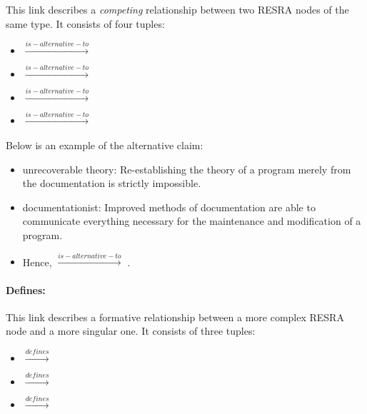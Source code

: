 This link describes a {\it competing\/} relationship between two RESRA
nodes of the same type. It consists of four tuples:

\begin{itemize}
\item {}
\( \stackrel{is-alternative-to}{\longrightarrow}  \)

\item {}
  \( \stackrel{is-alternative-to}{\longrightarrow} \)

\item {}
  \( \stackrel{is-alternative-to}{\longrightarrow} \)

\item {}
  \( \stackrel{is-alternative-to}{\longrightarrow} \)
\end{itemize}

\paragraph{}Below is an example of the alternative claim:

\small
\begin{itemize}
\item {\sf unrecoverable theory}: Re-establishing the theory of a program
  merely from the documentation is strictly impossible.
  
\item {\sf documentationist}: Improved methods of documentation
  are able to communicate everything necessary for the maintenance and
  modification of a program.
  
\item Hence, \hspace{.01in} 
  \( \stackrel{is-alternative-to}{\longrightarrow} \) .
\end{itemize}
\normalsize

\paragraph{Defines:}

This link describes a formative relationship between a more complex RESRA
node and a more singular one. It consists of three tuples:

\begin{itemize}
\item {} \( \stackrel{defines}{\longrightarrow} \) 

\item {} \( \stackrel{defines}{\longrightarrow} \) 

\item {} \( \stackrel{defines}{\longrightarrow} \) 
\end{itemize}

